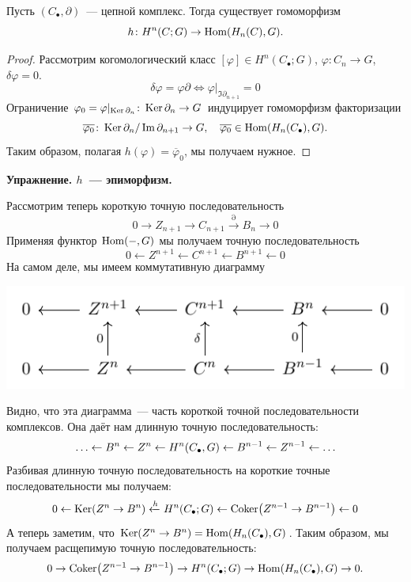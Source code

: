     \begin{statement}
        Пусть $(C_{\bullet}, \partial)$~--- цепной комплекс. Тогда существует гомоморфизм
        \[ h\colon H^{n}(C; G) \to \Hom\lr*{H_n(C), G}. \]
    \end{statement}
    \begin{proof}
        Рассмотрим когомологический класс  $[\varphi] \in H^{n}(C_{\bullet}; G)$, $\varphi\colon C_n \to G$, $\delta \varphi = 0$.
        \[ \delta \varphi = \varphi \partial \Leftrightarrow \varphi\vert_{\Im{\partial_{n + 1}}} = 0\]
        Ограничение $\varphi_0 = \varphi\vert_{\operatorname{Ker}{\partial_{n}}} \colon \operatorname{Ker}{\partial_n} \to G$ индуцирует гомоморфизм факторизации
        \[ \overline{\varphi_0} \colon \operatorname{Ker}{\partial_n}/\mathop{\mathrm{Im}}\nolimits{\partial_{n + 1}} \to G, \quad \overline{\varphi_0} \in \operatorname{Hom}(H_{n}(C_{\bullet}), G).\]
        Таким образом, полагая $h(\varphi) = \overline{\varphi}_0$, мы получаем нужное.
    \end{proof}

    \bf{Упражнение.} $h$~--- эпиморфизм.

    Рассмотрим теперь короткую точную последовательность
    \[ 0 \to Z_{n + 1} \to C_{n + 1} \xrightarrow{\partial} B_{n} \to 0\]
    Применяя функтор $\operatorname{Hom}(-, G)$ мы получаем точную последовательность
    \[ 0 \leftarrow Z^{n + 1} \leftarrow C^{n + 1} \leftarrow B^{n + 1} \leftarrow 0 \]
    На самом деле, мы имеем коммутативную диаграмму
    \begin{center}
        \includegraphics{lectures/0/pictures/cd_13}
    \end{center}

    Видно, что эта диаграмма~--- часть короткой точной последовательности комплексов. Она даёт нам длинную точную последовательность:
    \[ \ldots \leftarrow B^{n} \leftarrow Z^{n} \leftarrow H^n\lr*{C_{\bullet}, G} \leftarrow B^{n - 1} \leftarrow Z^{n - 1} \leftarrow \ldots \]
    Разбивая длинную точную последовательность на короткие точные последовательности мы получаем:
    \[ 0 \leftarrow \Ker\lr*{Z^n \to B^n} \xleftarrow{h} H^n\lr*{C_{\bullet}; G} \leftarrow \Coker\lr*{Z^{n - 1} \to B^{n - 1}} \leftarrow 0\]
    А теперь заметим, что  $\Ker\lr*{Z^n \to B^n} = \Hom\lr*{H_{n}(C_{\bullet}), G}$. Таким образом, мы получаем  расщепимую точную последовательность:
    \[ 0 \to \Coker\lr*{Z^{n - 1} \to B^{n - 1}}  \to H^n\lr*{C_{\bullet}; G} \to \Hom\lr*{H_{n}(C_{\bullet}), G} \to 0. \]
    
